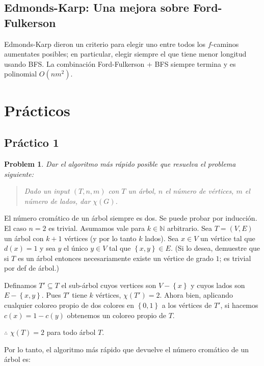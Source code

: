 \documentclass[a4paper, 12pt]{article}
\newtheorem{problem}{Problem}
\newtheorem{problem}{Problem}
\begin{document}
\subsection{Edmonds-Karp: Una mejora sobre Ford-Fulkerson}

Edmonds-Karp dieron un criterio para elegir uno entre todos los $f$-caminos
aumentates posibles; en particular, elegir siempre el que tiene menor longitud
usando BFS. La combinación Ford-Fulkerson + BFS siempre termina y es polinomial
$O(nm^2)$.

\pagebreak


\section{Prácticos}

\subsection{Práctico 1}

\begin{problem}
    Dar el algoritmo más rápido posible que resuelva el problema siguiente: 

    \begin{quote}
        Dado un input $(T, n, m)$ con $T$ un árbol, $n$ el número de vértices,
        $m$ el número de lados, dar $\chi(G)$.
    \end{quote}
\end{problem}

El número cromático de un árbol siempre es dos. Se puede probar por inducción.
El caso $n = 2$ es trivial. Asumamos vale para $k \in \mathbb{N}$ arbitrario.
Sea $T = (V, E)$ un árbol con $k + 1$ vértices (y por lo tanto $k$ lados).
Sea $x \in V$ un vértice tal que $d(x) = 1$ y sea $y$ el único $y \in V$ tal que
$\left\{ x, y \right\} \in E $. (Si lo desea, demuestre que si $T$
es un árbol entonces necesariamente existe un vértice de grado $1$; es trivial
por def de árbol.) 

Definamos $T' \subseteq T$ el sub-árbol cuyos vertices son $V - \left\{ x
\right\} $ y cuyos lados son $E - \left\{ x, y \right\} $. Pues $T'$ tiene $k$
vértices, $\chi(T') = 2$. Ahora bien, aplicando cualquier coloreo propio de dos
colores en $\left\{ 0, 1 \right\} $ a los vértices de $T'$, si hacemos $c(x) = 1
- c(y)$ obtenemos un coloreo propio de $T$. 

$\therefore $ $\chi(T) = 2$ para todo árbol $T$.

Por lo tanto, el algoritmo más rápido que devuelve el número cromático de un
árbol es:
\end{document}
